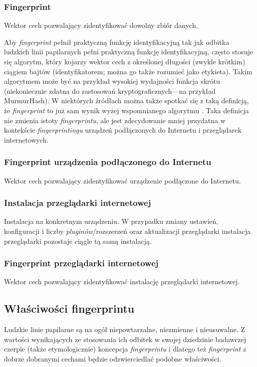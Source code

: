 \subsubsection{Fingerprint}
Wektor cech pozwalający zidentyfikować dowolny zbiór danych.

Aby \emph{fingerprint} pełnił praktyczną funkcję identyfikacyjną tak jak odbitka
ludzkich linii papilarnych pełni praktyczną funkcję identyfikacyjną, często
stosuje się algorytm, który kojarzy wektor cech z określonej długości (zwykle
krótkim) ciągiem bajtów (identyfikatorem; można go także rozumieć jako
etykieta). Takim algorytmem może być na przykład wysokiej wydajności funkcja
skrótu (niekoniecznie zdatna do zastosowań kryptograficznych---na przykład
MurmurHash). W niektórych źródłach można także spotkać się z taką definicją, że
\emph{fingerprint} to już sam wynik wyżej wspomnianego algorytmu
\cite[s. 123--132]{wu2018beauty}. Taka definicja nie zmienia istoty
\emph{fingerprintu}, ale jest zdecydowanie mniej przydatna w kontekście
\emph{fingerprintingu} urządzeń podłączonych do Internetu i przeglądarek
internetowych.

\subsubsection{Fingerprint urządzenia podłączonego do Internetu}
Wektor cech pozwalający zidentyfikować urządzenie podłączone do Internetu.

\subsubsection{Instalacja przeglądarki internetowej}
Instalacja na konkretnym urządzeniu. W przypadku zmiany ustawień, konfiguracji i
liczby \emph{pluginów}/rozszerzeń oraz aktualizacji przeglądarki instalacja
przeglądarki pozostaje ciągle tą samą instalacją.

\subsubsection{Fingerprint przeglądarki internetowej}
Wektor cech pozwalający zidentyfikować instalację przeglądarki internetowej.

\subsection{Właściwości fingerprintu}
Ludzkie linie papilarne są na ogół niepowtarzalne, niezmienne i nieusuwalne. Z
wartości wynikających ze stosowania ich odbitek w swojej dziedzinie badawczej
czerpie (także etymologicznie) koncepcja \emph{fingerprintu} i dlatego też
\emph{fingerprint} z dobrze dobranymi cechami będzie odzwierciedlać podobne
właściwości.

